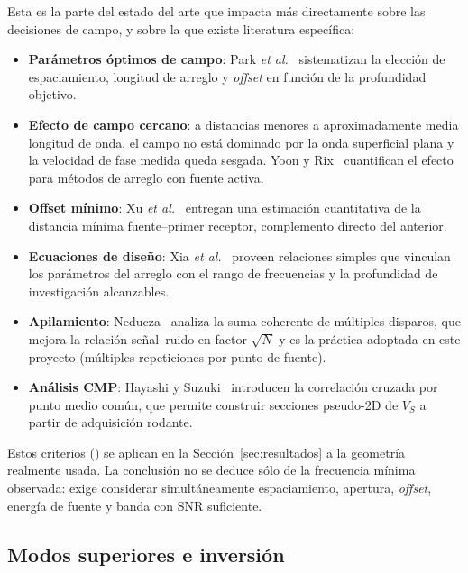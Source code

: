 Esta es la parte del estado del arte que impacta m\'as directamente sobre las decisiones
de campo, y sobre la que existe literatura espec\'ifica:

\begin{itemize}[itemsep=0.25em]
    \item \textbf{Par\'ametros \'optimos de campo}: Park \emph{et al.}~\cite{Park2002}
    sistematizan la elecci\'on de espaciamiento, longitud de arreglo y \emph{offset} en
    funci\'on de la profundidad objetivo.
    \item \textbf{Efecto de campo cercano}: a distancias menores a aproximadamente media
    longitud de onda, el campo no est\'a dominado por la onda superficial plana y la
    velocidad de fase medida queda sesgada. Yoon y Rix~\cite{Yoon2009} cuantifican el
    efecto para m\'etodos de arreglo con fuente activa.
    \item \textbf{Offset m\'inimo}: Xu \emph{et al.}~\cite{Xu2006} entregan una estimaci\'on
    cuantitativa de la distancia m\'inima fuente--primer receptor, complemento directo del
    anterior.
    \item \textbf{Ecuaciones de dise\~no}: Xia \emph{et al.}~\cite{Xia2006} proveen
    relaciones simples que vinculan los par\'ametros del arreglo con el rango de
    frecuencias y la profundidad de investigaci\'on alcanzables.
    \item \textbf{Apilamiento}: Neducza~\cite{Neducza2007} analiza la suma coherente de
    m\'ultiples disparos, que mejora la relaci\'on se\~nal--ruido en factor $\sqrt{N}$ y es
    la pr\'actica adoptada en este proyecto (m\'ultiples repeticiones por punto de fuente).
    \item \textbf{An\'alisis CMP}: Hayashi y Suzuki~\cite{Hayashi2004} introducen la
    correlaci\'on cruzada por punto medio com\'un, que permite construir secciones
    pseudo-2D de $V_S$ a partir de adquisici\'on rodante.
\end{itemize}

Estos criterios (\cite{Park2002,Yoon2009,Xu2006,Xia2006}) se aplican en la
Secci\'on~\ref{sec:resultados} a la geometr\'ia realmente usada. La conclusi\'on no se
deduce s\'olo de la frecuencia m\'inima observada: exige considerar simult\'aneamente
espaciamiento, apertura, \emph{offset}, energ\'ia de fuente y banda con SNR suficiente.

\subsection{Modos superiores e inversi\'on}

